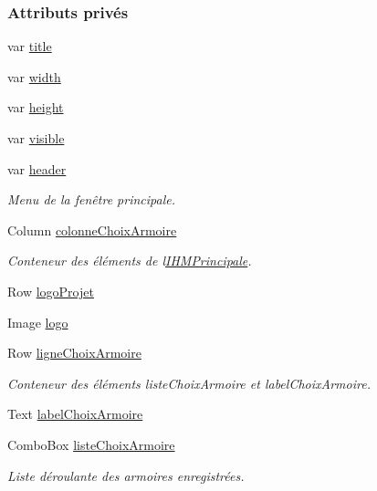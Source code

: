 \subsubsection*{Attributs privés}
\begin{DoxyCompactItemize}
\item 
var \hyperlink{class_i_h_m_principale_a3d70b1431aa098665f982d954ce846ac}{title}
\item 
var \hyperlink{class_i_h_m_principale_a62f341e9c7553288496a6df5e0f8e0f0}{width}
\item 
var \hyperlink{class_i_h_m_principale_aa73a9dde2b87ec74cf842b73a90d92c6}{height}
\item 
var \hyperlink{class_i_h_m_principale_a2e45968f2f317d593d7ac41e91a6f38c}{visible}
\item 
var \hyperlink{class_i_h_m_principale_a5ac548f1173e5c932587d7b6e73acf96}{header}
\begin{DoxyCompactList}\small\item\em Menu de la fenêtre principale. \end{DoxyCompactList}\item 
Column \hyperlink{class_i_h_m_principale_a0823fbd3be4579e4bc83572f4ac39746}{colonne\+Choix\+Armoire}
\begin{DoxyCompactList}\small\item\em Conteneur des éléments de l\textquotesingle{}\hyperlink{class_i_h_m_principale}{I\+H\+M\+Principale}. \end{DoxyCompactList}\item 
Row \hyperlink{class_i_h_m_principale_ac25153919be592b01ab7940e4c02072d}{logo\+Projet}
\item 
Image \hyperlink{class_i_h_m_principale_a06e5acf8505fe3dfbefa4ee1407def68}{logo}
\item 
Row \hyperlink{class_i_h_m_principale_a2e729d7c156bf0cdfb41601e3ff724d0}{ligne\+Choix\+Armoire}
\begin{DoxyCompactList}\small\item\em Conteneur des éléments liste\+Choix\+Armoire et label\+Choix\+Armoire. \end{DoxyCompactList}\item 
Text \hyperlink{class_i_h_m_principale_a7f603c77d449495edd600b5e599fb5c5}{label\+Choix\+Armoire}
\item 
Combo\+Box \hyperlink{class_i_h_m_principale_af363e06f3f872fdd8e4d27d6b15d8afe}{liste\+Choix\+Armoire}
\begin{DoxyCompactList}\small\item\em Liste déroulante des armoires enregistrées. \end{DoxyCompactList}\item 

\end{DoxyCompactItemize}

